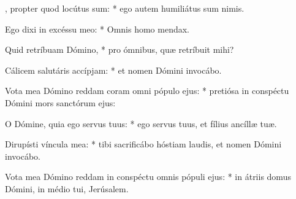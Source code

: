 \begin{psalmus}
    
    , propter quod locútus sum: * ego autem humiliátus sum nimis.
    
    Ego dixi in excéssu meo: * Omnis homo mendax.
    
    Quid retríbuam Dómino, * pro ómnibus, quæ retríbuit mihi?
    
    Cálicem salutáris accípjam: * et nomen Dómini invocábo.
    
    Vota mea Dómino reddam coram omni pópulo ejus: * pretiósa in conspéctu Dómini mors sanctórum ejus:
    
    O Dómine, quia ego servus tuus: * ego servus tuus, et fílius ancíllæ tuæ.
    
    Dirupísti víncula mea: * tibi sacrificábo hóstiam laudis, et nomen Dómini invocábo.
    
    Vota mea Dómino reddam in conspéctu omnis pópuli ejus: * in átriis domus Dómini, in médio tui, Jerúsalem.
    
    \end{psalmus}